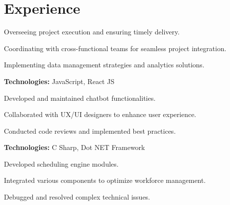 \documentclass[]{deedy-resume-openfont}
\begin{document}
\begin{minipage}[t]{0.66\textwidth} 


\section{Experience}
\vspace{\topsep}
\vspace{\topsep} %
\begin{tightemize}
\item Overseeing project execution and ensuring timely delivery.
\item Coordinating with cross-functional teams for seamless project integration.
\item Implementing data management strategies and analytics solutions.
\end{tightemize}
\vspace{\topsep}
\vspace{\topsep}
\textbf{Technologies:} JavaScript, React JS 
\begin{tightemize}
\item Developed and maintained chatbot functionalities.
\item Collaborated with UX/UI designers to enhance user experience.
\item Conducted code reviews and implemented best practices.
\end{tightemize}
\vspace{\topsep}
\textbf{Technologies:} C Sharp, Dot NET Framework 
\begin{tightemize}
\item Developed scheduling engine modules.
\item Integrated various components to optimize workforce management.
\item Debugged and resolved complex technical issues.
\end{tightemize}
\sectionsep



\end{minipage}
\end{document}
